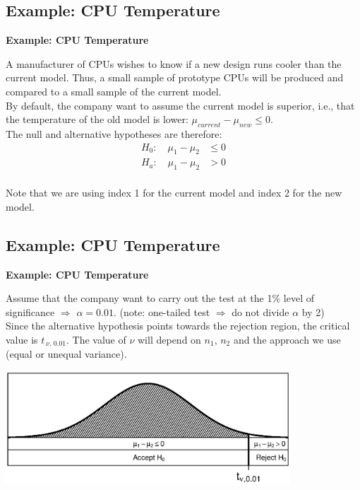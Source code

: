 \documentclass[compress]{beamer}        %
\makeatletter
\newcommand{\tcb}{\textcolor{beamer@blendedblue}}
\makeatother
\begin{document}
\subsection{Example: CPU Temperature}
\begin{frame}{\bf \tcb{Example: CPU Temperature}}

A manufacturer of CPUs wishes to know if a new design runs cooler than the current model. Thus, a small sample of prototype CPUs will be produced and compared to a small sample of the current model.\\[0.6cm]

By default, the company want to assume the current model is superior, i.e., that the temperature of the old model is lower: $\mu_{current}-\mu_{new}\le0$.\\[0.6cm]

The null and alternative hypotheses are therefore:
\begin{align*}
H_0:\quad \mu_1-\mu_2 &\le 0 \\[0.2cm]
H_a:\quad \mu_1-\mu_2 &> 0 \\[-0.4cm]
\end{align*}

Note that we are using index 1 for the current model and index 2 for the new model.


\end{frame}



\subsection{Example: CPU Temperature}
\begin{frame}{\bf \tcb{Example: CPU Temperature}}

Assume that the company want to carry out the test at the 1\% level of significance $\Rightarrow$ $\alpha=0.01$. {\footnotesize(note: one-tailed test $\Rightarrow$ do not divide $\alpha$ by 2)}\\[0.4cm]

Since the alternative hypothesis points towards the rejection region, the critical value is $t_{\,\nu,\,0.01}$. The value of $\nu$ will depend on $n_1$, $n_2$ and the approach we use (equal or unequal variance).\\
\begin{center}
\includegraphics[width=0.8\textwidth, trim = 1.5cm 1.6cm 0.7cm 1.5cm, clip]{RejectRegion}
\end{center}

\end{frame}
\end{document}
